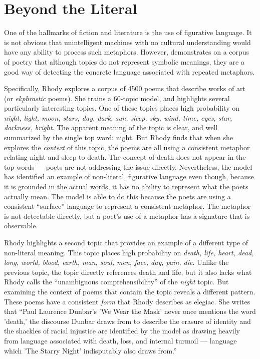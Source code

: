 \section{Beyond the Literal}

One of the hallmarks of fiction and literature is the use of figurative language.
It is not obvious that unintelligent machines with no cultural understanding would have any ability to process such metaphors. However, \cite{rhody-12} demonstrates on a corpus of poetry that although topics do not represent symbolic meanings, they are a good way of detecting the concrete language associated with repeated metaphors.

Specifically, Rhody explores a corpus of 4500 poems that describe works of art (or {\em ekphrastic} poems).
She trains a 60-topic model, and highlights several particularly interesting topics.
One of these topics places high probability on {\em night, light, moon, stars, day, dark, sun, sleep, sky, wind, time, eyes, star, darkness, bright}.
The apparent meaning of the topic is clear, and well summarized by the single top word: night.
But Rhody finds that when she explores the {\em context} of this topic, the poems are all using a consistent metaphor relating night and sleep to death.
The concept of death does not appear in the top words --- poets are not addressing the issue directly.
Nevertheless, the model has identified an example of non-literal, figurative language even though, because it is grounded in the actual words, it has no ability to represent what the poets actually mean.
The model is able to do this because the poets are using a consistent ``surface'' language to represent a consistent metaphor.
The metaphor is not detectable directly, but a poet's use of a metaphor has a signature that is observable.

Rhody highlights a second topic that provides an example of a different type of non-literal meaning.
This topic places high probability on {\em death, life, heart, dead, long, world, blood, earth, man, soul, men, face, day, pain, die}.
Unlike the previous topic, the topic directly references death and life, but it also lacks what Rhody calls the ``unambiguous comprehensibility'' of the {\em night} topic.
But examining the context of poems that contain the topic reveals a different pattern.
These poems have a consistent {\em form} that Rhody describes as elegiac.
She writes that ``Paul Laurence Dunbar's 'We Wear the Mask' never once mentions the word 'death,' the discourse Dunbar draws from to describe the erasure of identity and the shackles of racial injustice are identified by the model as drawing heavily from language associated with death, loss, and internal turmoil --- language which 'The Starry Night' indisputably also draws from.''

